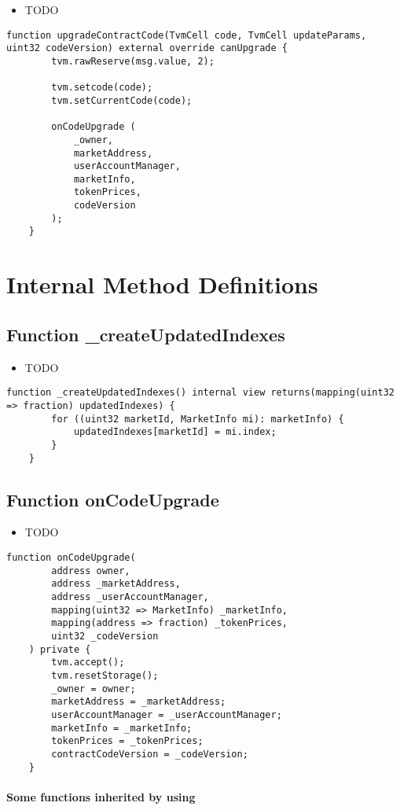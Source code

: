 \noindent\begin{itemize}
\item TODO
\end{itemize}

\begin{lstlisting}[firstnumber=23]
    function upgradeContractCode(TvmCell code, TvmCell updateParams, uint32 codeVersion) external override canUpgrade {
        tvm.rawReserve(msg.value, 2);

        tvm.setcode(code);
        tvm.setCurrentCode(code);

        onCodeUpgrade (
            _owner,
            marketAddress,
            userAccountManager,
            marketInfo,
            tokenPrices,
            codeVersion
        );
    }
\end{lstlisting}

\section{Internal Method Definitions}


\subsection{Function \_{}createUpdatedIndexes}

\noindent\begin{itemize}
\item TODO
\end{itemize}

\begin{lstlisting}[firstnumber=229]
    function _createUpdatedIndexes() internal view returns(mapping(uint32 => fraction) updatedIndexes) {
        for ((uint32 marketId, MarketInfo mi): marketInfo) {
            updatedIndexes[marketId] = mi.index;
        }
    }
\end{lstlisting}

\subsection{Function onCodeUpgrade}

\noindent\begin{itemize}
\item TODO
\end{itemize}

\begin{lstlisting}[firstnumber=39]
    function onCodeUpgrade(
        address owner,
        address _marketAddress,
        address _userAccountManager,
        mapping(uint32 => MarketInfo) _marketInfo,
        mapping(address => fraction) _tokenPrices,
        uint32 _codeVersion
    ) private {
        tvm.accept();
        tvm.resetStorage();
        _owner = owner;
        marketAddress = _marketAddress;
        userAccountManager = _userAccountManager;
        marketInfo = _marketInfo;
        tokenPrices = _tokenPrices;
        contractCodeVersion = _codeVersion;
    }
\end{lstlisting}
\paragraph{Some functions inherited by using}
